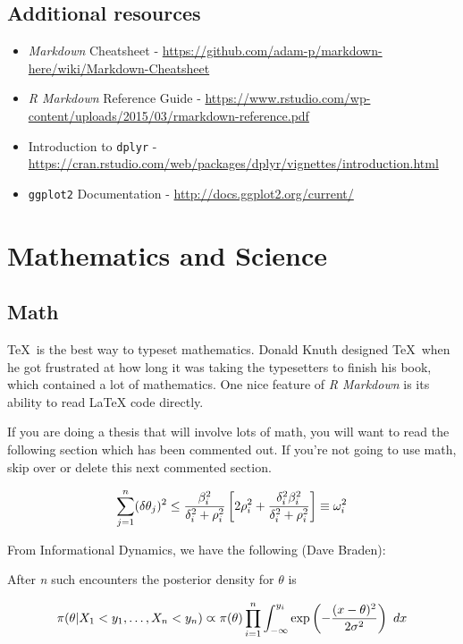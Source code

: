 \documentclass[12pt,twoside]{Mactemplate}
\theoremstyle{definition}
\theoremstyle{definition}
\theoremstyle{definition}
\theoremstyle{remark}
\begin{document}
\section{Additional resources}\label{additional-resources}
\begin{itemize}
\item
  \emph{Markdown} Cheatsheet -
  \url{https://github.com/adam-p/markdown-here/wiki/Markdown-Cheatsheet}
\item
  \emph{R Markdown} Reference Guide -
  \url{https://www.rstudio.com/wp-content/uploads/2015/03/rmarkdown-reference.pdf}
\item
  Introduction to \texttt{dplyr} -
  \url{https://cran.rstudio.com/web/packages/dplyr/vignettes/introduction.html}
\item
  \texttt{ggplot2} Documentation -
  \url{http://docs.ggplot2.org/current/}
\end{itemize}
\hypertarget{math-sci}{\chapter{Mathematics and
Science}\label{math-sci}}

\hypertarget{math}{\section{Math}\label{math}}

\TeX~is the best way to typeset mathematics. Donald Knuth designed
\TeX~when he got frustrated at how long it was taking the typesetters to
finish his book, which contained a lot of mathematics. One nice feature
of \emph{R Markdown} is its ability to read LaTeX code directly.

If you are doing a thesis that will involve lots of math, you will want
to read the following section which has been commented out. If you're
not going to use math, skip over or delete this next commented section.

\[\sum_{j=1}^n (\delta\theta_j)^2 \leq {{\beta_i^2}\over{\delta_i^2 + \rho_i^2}}
\left[ 2\rho_i^2 + {\delta_i^2\beta_i^2\over{\delta_i^2 + \rho_i^2}} \right] \equiv \omega_i^2
\]

From Informational Dynamics, we have the following (Dave Braden):

After \emph{n} such encounters the posterior density for \(\theta\) is

\[
\pi(\theta|X_1< y_1,\dots,X_n<y_n) \varpropto \pi(\theta) \prod_{i=1}^n\int_{-\infty}^{y_i}
   \exp\left(-{(x-\theta)^2\over{2\sigma^2}}\right)\ dx
\]
\end{document}
